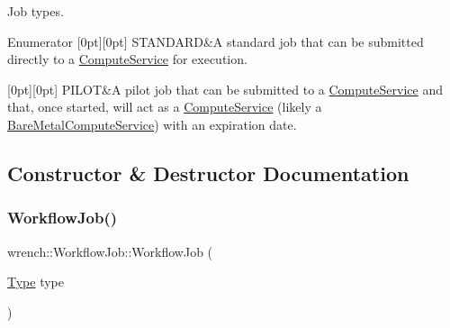 Job types. 

\begin{DoxyEnumFields}{Enumerator}
[0pt][0pt]{}\mbox{\label{classwrench_1_1_workflow_job_a5dcf81c50b5d221ef2a48126bf45d08ba12e4d89be33b16c05c2628f09e1ac0de}} 
S\+T\+A\+N\+D\+A\+RD&A standard job that can be submitted directly to a \hyperlink{classwrench_1_1_compute_service}{Compute\+Service} for execution. \\
\hline

[0pt][0pt]{}\mbox{\label{classwrench_1_1_workflow_job_a5dcf81c50b5d221ef2a48126bf45d08ba3eab6a0caa1eae9cbb7321a083125543}} 
P\+I\+L\+OT&A pilot job that can be submitted to a \hyperlink{classwrench_1_1_compute_service}{Compute\+Service} and that, once started, will act as a \hyperlink{classwrench_1_1_compute_service}{Compute\+Service} (likely a \hyperlink{classwrench_1_1_bare_metal_compute_service}{Bare\+Metal\+Compute\+Service}) with an expiration date. \\
\hline

\end{DoxyEnumFields}


\subsection{Constructor \& Destructor Documentation}
\mbox{\label{classwrench_1_1_workflow_job_a2c1b2e3a711878bc7fcae1e12b55dd24}} 
\subsubsection{\texorpdfstring{Workflow\+Job()}{WorkflowJob()}}
{\footnotesize\ttfamily wrench\+::\+Workflow\+Job\+::\+Workflow\+Job (\begin{DoxyParamCaption}\item[{\hyperlink{classwrench_1_1_workflow_job_a5dcf81c50b5d221ef2a48126bf45d08b}{Type}}]{type }\end{DoxyParamCaption})\hspace{0.3cm}{\ttfamily [protected]}}



